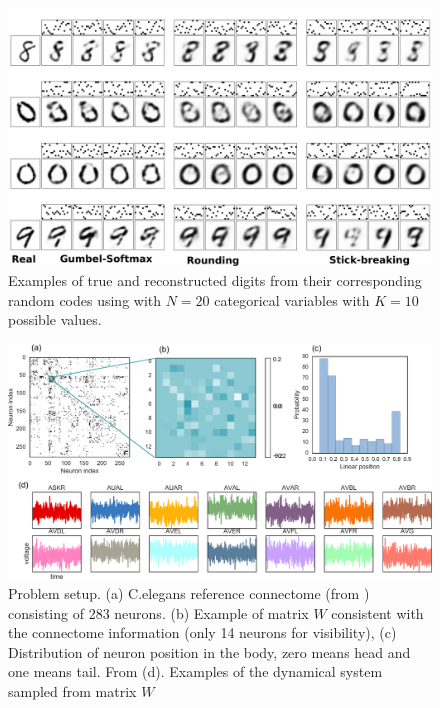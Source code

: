 \begin{figure}[t]
  \centering
  \includegraphics[width=5.in]{../figures/figure4.pdf} 
  \caption{Examples of true and reconstructed digits from their corresponding random codes using with $N=20$ categorical variables with $K=10$ possible values.
  }
\label{fig:synthetic}
\end{figure}
\begin{figure}[t]
  \centering
  \includegraphics[width=5.in]{../figures/figure6.pdf} 
  \caption{Problem setup. (a) C.elegans reference connectome (from \cite{varshney2011structural,wormatlas}) consisting of 283 neurons. (b) Example of matrix $W$ consistent with the connectome information (only 14 neurons for visibility), (c) Distribution of neuron position in the body, zero means head and one means tail. From \cite{white1986structure,wormatlas}  (d). Examples of the dynamical system sampled from matrix $W$}
\label{fig:transforms}
\end{figure}



\label{fig:synthetic}

